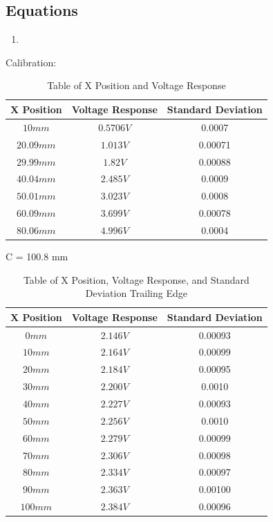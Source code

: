\documentclass{article}
\begin{document}
\begin{enumerate}
\subsection*{Equations}
\begin{enumerate}[label = \Roman*.]
    \item 
\end{enumerate} 

Calibration:
\begin{table}[ht]
\centering
\begin{tabular}{|c|c|c|}
\hline
\textbf{X Position} & \textbf{Voltage Response} & \textbf{Standard Deviation} \\
\hline
$10 mm$ & $0.5706 V$ & 0.0007\\
\hline
$20.09 mm$ & $1.013 V$ & 0.00071 \\
\hline
$29.99 mm$ & $1.82 V$ & 0.00088 \\
\hline
$40.04 mm$ & $2.485 V$ & 0.0009\\
\hline
$50.01 mm$ & $3.023 V$ & 0.0008\\
\hline
$60.09 mm$ & $3.699 V$ & 0.00078\\
\hline
$80.06 mm$ & $4.996 V$ & 0.0004\\
\hline
\end{tabular}
\caption{Table of X Position and Voltage Response}
\label{tab:position_voltage}
\end{table}

C = 100.8 mm

\begin{table}[ht]
\centering
\begin{tabular}{|c|c|c|}
\hline
\textbf{X Position} & \textbf{Voltage Response} & \textbf{Standard Deviation} \\
\hline
$0 mm$ & $2.146 V$ & 0.00093 \\
\hline
$10 mm$ & $2.164 V$ & 0.00099\\
\hline
$20 mm$ & $2.184 V$ & 0.00095\\
\hline
$30 mm$ & $2.200 V$ & 0.0010 \\
\hline
$40 mm$ & $2.227 V$ & 0.00093 \\
\hline
$50 mm$ & $2.256 V$ & 0.0010 \\
\hline
$60 mm$ & $2.279 V$ & 0.00099 \\
\hline
$70 mm$ & $2.306 V$ & 0.00098 \\
\hline
$80 mm$ & $2.334 V$ & 0.00097\\
\hline
$90 mm$ & $2.363 V$ & 0.00100\\
\hline
$100 mm$ & $2.384 V$ & 0.00096\\
\hline
\end{tabular}
\caption{Table of X Position, Voltage Response, and Standard Deviation Trailing Edge}
\label{tab:position_voltage_stddev}
\end{table}


\end{enumerate}
\end{document}
